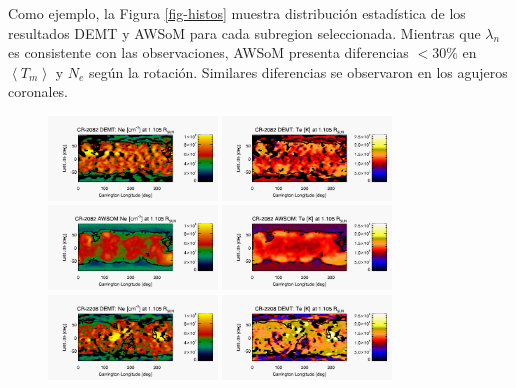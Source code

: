 \documentclass[baaa]{baaa}
\begin{document}
Como ejemplo, la Figura \ref{fig-histos} muestra distribución estadística de los resultados DEMT y AWSoM para cada subregion seleccionada. Mientras que $\lambda_n$ es consistente con las observaciones, AWSoM presenta diferencias $<30\%$ en $\left<T_m\right>$ y $N_e$ según la rotación. Similares diferencias se observaron en los agujeros coronales.


\begin{figure}
  \centering
  \includegraphics[width=0.4\textwidth]{figuras/map_Ne_CR2082_DEMT-EUVI_behind_H1-L3523_r3d_1105_Rsun.jpg}
  \includegraphics[width=0.4\textwidth]{figuras/map_Tm_CR2082_DEMT-EUVI_behind_H1-L3523_r3d_1105_Rsun.jpg}
  \includegraphics[width=0.4\textwidth]{figuras/map_Ne_awsom_2082_185_short_1105_Rsun.jpg}
  \includegraphics[width=0.4\textwidth]{figuras/map_Te_awsom_2082_185_short_1105_Rsun.jpg}
  \includegraphics[width=0.4\textwidth]{figuras/map_Ne_CR2208_DEMT-AIA_H1_L522_r3d_1105_Rsun.jpg}
  \includegraphics[width=0.4\textwidth]{figuras/map_Tm_CR2208_DEMT-AIA_H1_L522_r3d_1105_Rsun.jpg}  

\end{figure}
\end{document}
